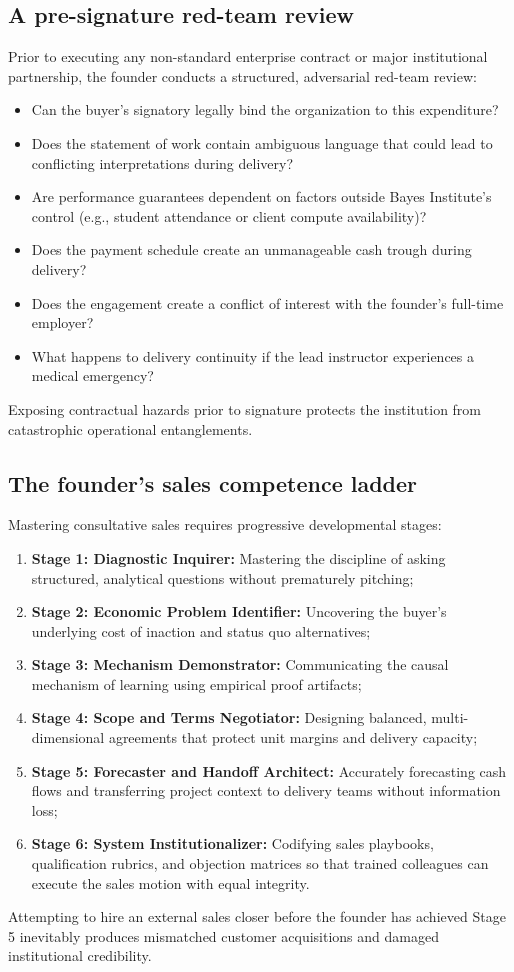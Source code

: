\subsection{A pre-signature red-team review}

Prior to executing any non-standard enterprise contract or major institutional partnership, the founder conducts a structured, adversarial red-team review:
\begin{itemize}
\item Can the buyer's signatory legally bind the organization to this expenditure?
\item Does the statement of work contain ambiguous language that could lead to conflicting interpretations during delivery?
\item Are performance guarantees dependent on factors outside Bayes Institute's control (e.g., student attendance or client compute availability)?
\item Does the payment schedule create an unmanageable cash trough during delivery?
\item Does the engagement create a conflict of interest with the founder's full-time employer?
\item What happens to delivery continuity if the lead instructor experiences a medical emergency?
\end{itemize}
Exposing contractual hazards prior to signature protects the institution from catastrophic operational entanglements.

\subsection{The founder's sales competence ladder}

Mastering consultative sales requires progressive developmental stages:
\begin{enumerate}
\item \textbf{Stage 1: Diagnostic Inquirer:} Mastering the discipline of asking structured, analytical questions without prematurely pitching;
\item \textbf{Stage 2: Economic Problem Identifier:} Uncovering the buyer's underlying cost of inaction and status quo alternatives;
\item \textbf{Stage 3: Mechanism Demonstrator:} Communicating the causal mechanism of learning using empirical proof artifacts;
\item \textbf{Stage 4: Scope and Terms Negotiator:} Designing balanced, multi-dimensional agreements that protect unit margins and delivery capacity;
\item \textbf{Stage 5: Forecaster and Handoff Architect:} Accurately forecasting cash flows and transferring project context to delivery teams without information loss;
\item \textbf{Stage 6: System Institutionalizer:} Codifying sales playbooks, qualification rubrics, and objection matrices so that trained colleagues can execute the sales motion with equal integrity.
\end{enumerate}
Attempting to hire an external sales closer before the founder has achieved Stage 5 inevitably produces mismatched customer acquisitions and damaged institutional credibility.
